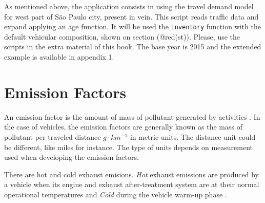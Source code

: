 \documentclass[12pt,graybox,envcountchap,sectrefs]{krantz}
\makeatletter
\newenvironment{Shaded}{\begin{snugshade}}{\end{snugshade}}
\newcommand{\KeywordTok}[1]{\textcolor[rgb]{0.13,0.29,0.53}{\textbf{#1}}}
\newcommand{\DataTypeTok}[1]{\textcolor[rgb]{0.13,0.29,0.53}{#1}}
\newcommand{\StringTok}[1]{\textcolor[rgb]{0.31,0.60,0.02}{#1}}
\newcommand{\CommentTok}[1]{\textcolor[rgb]{0.56,0.35,0.01}{\textit{#1}}}
\newcommand{\OperatorTok}[1]{\textcolor[rgb]{0.81,0.36,0.00}{\textbf{#1}}}
\newcommand{\NormalTok}[1]{#1}
\newenvironment{kframe}{%
\medskip{}
\setlength{\fboxsep}{.8em}
 \def\at@end@of@kframe{}%
 \ifinner\ifhmode%
  \def\at@end@of@kframe{\end{minipage}}%
  \begin{minipage}{\columnwidth}%
 \fi\fi%
 \def\FrameCommand##1{\hskip\@totalleftmargin \hskip-\fboxsep
 \colorbox{shadecolor}{##1}\hskip-\fboxsep
     \hskip-\linewidth \hskip-\@totalleftmargin \hskip\columnwidth}%
 \MakeFramed {\advance\hsize-\width
   \@totalleftmargin\z@ \linewidth\hsize
   \@setminipage}}%
 {\par\unskip\endMakeFramed%
 \at@end@of@kframe}
\renewenvironment{Shaded}{\begin{kframe}}{\end{kframe}}
\theoremstyle{definition}
\theoremstyle{definition}
\theoremstyle{definition}
\theoremstyle{remark}
\makeatother
\begin{document}
As mentioned above, the application consists in using the travel demand
model for west part of São Paulo city, present in vein. This script
reads traffic data and expand applying an age function. It will be used
the \texttt{inventory} function with the default vehicular composition,
shown on section (@red(st)). Please, use the scripts in the extra
material of this book. The base year is 2015 and the extended example is
available in appendix 1.

\begin{Shaded}
\end{Shaded}

\chapter{Emission Factors}\label{ef}

An emission factor is the amount of mass of pollutant generated by
activities \citep{pulles2010art}. In the case of vehicles, the emission
factors are generally known as the mass of pollutant per traveled
distance \(g \cdot km^{-1}\) in metric units. The distance unit could be
different, like miles for instance. The type of units depends on
measurement used when developing the emission factors.

There are hot and cold exhaust emisions. \emph{Hot} exhaust emissions
are produced by a vehicle when its engine and exhaust after-treatment
system are at their normal operational temperatures and \emph{Cold}
during the vehicle warm-up phase \citep{trlef}.
\end{document}
